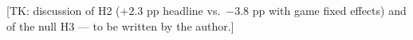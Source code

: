 \documentclass[11pt]{article}
\begin{document}
%
%
%

[TK: discussion of H2 ($+2.3$ pp headline vs.\ $-3.8$ pp with game fixed
effects) and of the null H3 --- to be written by the author.]
\end{document}
